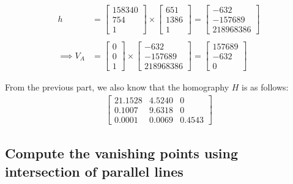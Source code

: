 \documentclass[12pt, oneside]{article}
\begin{document}
\begin{align*}
h   &=  \begin{bmatrix} 158340  \\ 754 \\ 1  \end{bmatrix} \times 
        \begin{bmatrix} 651   \\ 1386 \\   1   \end{bmatrix} 
    =  \begin{bmatrix} -632   \\ -157689   \\ 218968386   \end{bmatrix}  \\ \\   
\implies V_A  &=  \begin{bmatrix} 0   \\ 0   \\ 1   \end{bmatrix} \times
        \begin{bmatrix} -632   \\ -157689   \\ 218968386   \end{bmatrix} 
    =  \begin{bmatrix} 157689   \\ -632   \\ 0   \end{bmatrix} 
\end{align*}

From the previous part, we also know that the homography $H$ is as follows:
\begin{align*}
\begin{bmatrix}
    21.1528     &   4.5240  & 0 \\
    0.1007       &   9.6318   & 0 \\
    0.0001       &   0.0069 & 0.4543
\end{bmatrix}
\end{align*}

\subsection{Compute the vanishing points using intersection of parallel lines}
\end{document}
